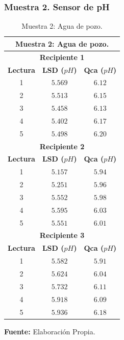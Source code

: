 \subsubsection{Muestra 2. Sensor de pH}
    \begin{table}[H]
        \protect\caption[Muestra 2: Agua de pozo ]{Muestra 2: Agua de pozo.}
        \label{tab:phMuestra2}
        \centering
        \begin{tabular}{c c c}
            \hline
            \multicolumn{3}{c}{\textbf{Muestra 2: Agua de pozo.}} \\
             \hline
            \multicolumn{3}{c}{\textbf{Recipiente 1}} \\
            \hline
            \textbf{Lectura}&\textbf{LSD ($pH$)}&\textbf{Qca ($pH$)} \\
            \hline
            {1}& $5.569$&$6.12$ \\ 
            {2}& $5.513$&$6.15$ \\ 
            {3}& $5.458$&$6.13$\\  
            {4}& $5.402$&$6.17$\\ 
            {5}& $5.498$&$6.20$ \\
            \hline
            \multicolumn{3}{c}{\textbf{Recipiente 2}} \\
            \hline
            \textbf{Lectura}&\textbf{LSD ($pH$)}&\textbf{Qca ($pH$)} \\
            \hline
            {1}& $5.157$&$5.94$ \\ 
            {2}& $5.251$&$5.96$ \\ 
            {3}& $5.552$&$5.98$ \\  
            {4}& $5.595$&$6.03$ \\ 
            {5}& $5.551$&$6.01$ \\
            \hline
            \multicolumn{3}{c}{\textbf{Recipiente 3}} \\
            \hline
            \textbf{Lectura}&\textbf{LSD ($pH$)}&\textbf{Qca ($pH$)} \\
            \hline
            {1}& $5.582$&$5.91$ \\ 
            {2}& $5.624$&$6.04$ \\ 
            {3}&$5.732$&$6.11$ \\  
            {4}& $5.918$&$6.09$\\ 
            {5}& $5.936$&$6.18$ \\
            \hline
        \end{tabular}
        \vspace{5mm}
        \newline
        \hfill \textbf{Fuente: }Elaboración Propia.
    \end{table}

